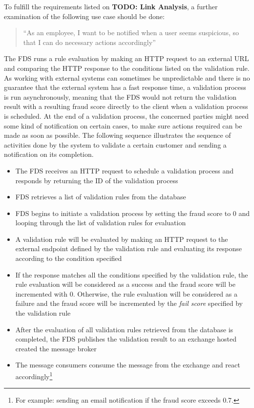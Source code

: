 To fulfill the requirements listed on \textbf{TODO: Link Analysis}, a further examination of the following use case should be done:

\begin{quotation}
 \enquote{As an employee, I want to be notified when a user seems suspicious, so that I can do necessary actions accordingly} 
\end{quotation}

The FDS runs a rule evaluation by making an HTTP request to an external URL and comparing the HTTP response to the conditions listed on the validation rule. As working with external systems can sometimes be unpredictable and there is no guarantee that the external system has a fast response time, a validation process is run asynchronously, meaning that the FDS would not return the validation result with a resulting fraud score directly to the client when a validation process is scheduled. At the end of a validation process, the concerned parties might need some kind of notification on certain cases, to make sure actions required can be made as soon as possible. The following sequence illustrates the sequence of activities done by the system to validate a certain customer and sending a notification on its completion.

\begin{itemize}
 \item The FDS receives an HTTP request to schedule a validation process and responds by returning the ID of the validation process
 \item FDS retrieves a list of validation rules from the database
 \item FDS begins to initiate a validation process by setting the fraud score to 0 and looping through the list of validation rules for evaluation
 \item A validation rule will be evaluated by making an HTTP request to the external endpoint defined by the validation rule and evaluating its response according to the condition specified
 \item If the response matches all the conditions specified by the validation rule, the rule evaluation will be considered as a success and the fraud score will be incremented with 0. Otherwise, the rule evaluation will be considered as a failure and the fraud score will be incremented by the \emph{fail score} specified by the validation rule
 \item After the evaluation of all validation rules retrieved from the database is completed, the FDS publishes the validation result to an exchange hosted created the message broker
 \item The message consumers consume the message from the exchange and react accordingly\footnote{For example: sending an email notification if the fraud score exceeds 0.7.}
\end{itemize}


